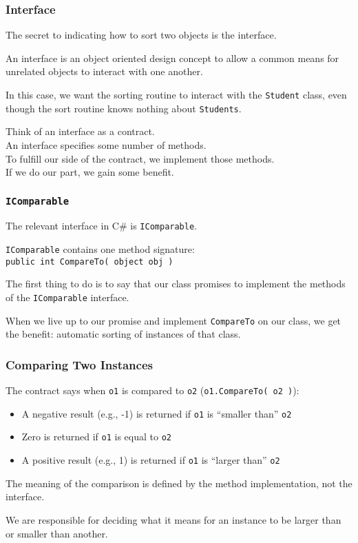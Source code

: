 \begin{frame}
\frametitle{Interface}
The secret to indicating how to sort two objects is the \alert{interface}.

An interface is an object oriented design concept to allow a common means for unrelated objects to interact with one another.

In this case, we want the sorting routine to interact with the \texttt{Student} class, even though the sort routine knows nothing about \texttt{Students}.

Think of an interface as a contract.\\
\quad An interface specifies some number of methods.\\
\quad To fulfill our side of the contract, we implement those methods.\\
\quad If we do our part, we gain some benefit.

\end{frame}

\begin{frame}
\frametitle{\texttt{IComparable}}

The relevant interface in C\# is \alert{\texttt{IComparable}}.

\texttt{IComparable} contains one method signature:\\
\quad \texttt{public int CompareTo( object obj )}

The first thing to do is to say that our class promises to implement the methods of the \texttt{IComparable} interface.

When we live up to our promise and implement \texttt{CompareTo} on our class, we get the benefit: automatic sorting of instances of that class.

\end{frame}


\begin{frame}
\frametitle{Comparing Two Instances}


The contract says when \texttt{o1} is compared to \texttt{o2} (\texttt{o1.CompareTo( o2 )}):
\begin{itemize}
	\item A negative result (e.g., -1) is returned if \texttt{o1} is ``smaller than'' \texttt{o2}
	\item Zero is returned if \texttt{o1} is equal to \texttt{o2}
	\item A positive result (e.g., 1) is returned if \texttt{o1} is ``larger than'' \texttt{o2}
\end{itemize}

The meaning of the comparison is defined by the method implementation, not the interface.

We are responsible for deciding what it means for an instance to be larger than or smaller than another.

\end{frame}


